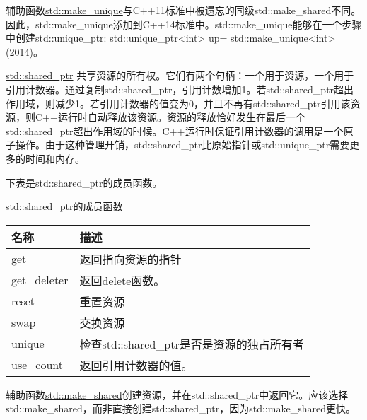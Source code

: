 

辅助函数\href{http://en.cppreference.com/w/cpp/memory/unique_ptr/make_unique}{std::make\_unique}与C++11标准中被遗忘的同级std::make\_shared不同。因此，std::make\_unique添加到C++14标准中。std::make\_unique能够在一个步骤中创建std::unique\_ptr: std::unique\_ptr<int> up= std::make\_unique<int>(2014)。



\href{http://en.cppreference.com/w/cpp/memory/shared_ptr}{std::shared\_ptr} 共享资源的所有权。它们有两个句柄：一个用于资源，一个用于引用计数器。通过复制std::shared\_ptr，引用计数增加1。若std::shared\_ptr超出作用域，则减少1。若引用计数器的值变为0，并且不再有std::shared\_ptr引用该资源，则C++运行时自动释放该资源。资源的释放恰好发生在最后一个std::shared\_ptr超出作用域的时候。C++运行时保证引用计数器的调用是一个原子操作。由于这种管理开销，std::shared\_ptr比原始指针或std::unique\_ptr需要更多的时间和内存。

下表是std::shared\_ptr的成员函数。

\begin{center}
std::shared\_ptr的成员函数
\end{center}

\begin{longtable}[c]{|l|l|}
\hline
\textbf{名称} & \textbf{描述}                                             \\ \hline
\endfirsthead
%
\endhead
%
get           & 返回指向资源的指针                                \\ \hline
get\_deleter  & 返回delete函数。                                      \\ \hline
reset         & 重置资源                                              \\ \hline
swap          & 交换资源                                               \\ \hline
unique        & 检查std::shared\_ptr是否是资源的独占所有者 \\ \hline
use\_count    & 返回引用计数器的值。                      \\ \hline
\end{longtable}


辅助函数\href{http://en.cppreference.com/w/cpp/memory/shared_ptr/make_shared}{std::make\_shared}创建资源，并在std::shared\_ptr中返回它。应该选择std::make\_shared，而非直接创建std::shared\_ptr，因为std::make\_shared更快。

